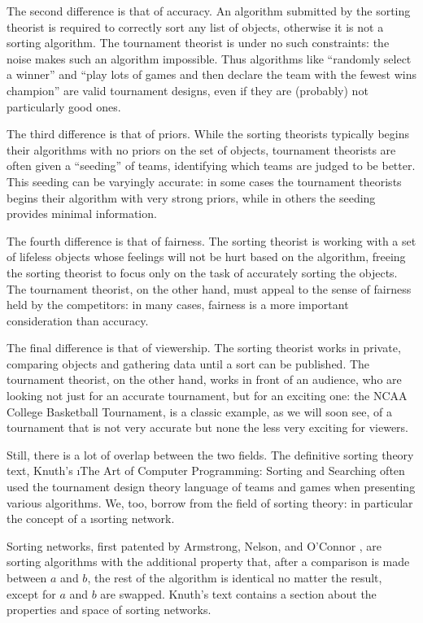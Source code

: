 {    The second difference is that of accuracy. An algorithm submitted by the sorting theorist is required to correctly sort any list of objects, otherwise it is not a sorting algorithm. The tournament theorist is under no such constraints: the noise makes such an algorithm impossible. Thus algorithms like ``randomly select a winner'' and ``play lots of games and then declare the team with the fewest wins champion'' are valid tournament designs, even if they are (probably) not particularly good ones.

    The third difference is that of priors. While the sorting theorists typically begins their algorithms with no priors on the set of objects, tournament theorists are often given a ``seeding'' of teams, identifying which teams are judged to be better. This seeding can be varyingly accurate: in some cases the tournament theorists begins their algorithm with very strong priors, while in others the seeding provides minimal information.

    The fourth difference is that of fairness. The sorting theorist is working with a set of lifeless objects whose feelings will not be hurt based on the algorithm, freeing the sorting theorist to focus only on the task of accurately sorting the objects. The tournament theorist, on the other hand, must appeal to the sense of fairness held by the competitors: in many cases, fairness is a more important consideration than accuracy. 
    
    The final difference is that of viewership. The sorting theorist works in private, comparing objects and gathering data until a sort can be published. The tournament theorist, on the other hand, works in front of an audience, who are looking not just for an accurate tournament, but for an exciting one: the NCAA College Basketball Tournament, is a classic example, as we will soon see, of a tournament that is not very accurate but none the less very exciting for viewers.

    Still, there is a lot of overlap between the two fields. The definitive sorting theory text, Knuth's \i{The Art of Computer Programming: Sorting and Searching} \cite{knuth} often used the tournament design theory language of teams and games when presenting various algorithms. We, too, borrow from the field of sorting theory: in particular the concept of a \i{sorting network}.

    Sorting networks, first patented by Armstrong, Nelson, and O'Connor \cite{pat}, are sorting algorithms with the additional property that, after a comparison is made between $a$ and $b$, the rest of the algorithm is identical no matter the result, except for $a$ and $b$ are swapped. Knuth's text contains a section about the properties and space of sorting networks.

}
